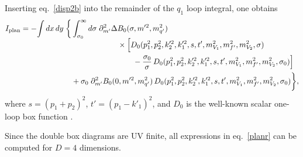 \documentclass[12pt]{article}
\begin{document}
Inserting eq.~\eqref{disp2b} into the remainder of the $q_1$ loop integral, one
obtains
\begin{align}
I_{\rm plan} = -\!\int dx \, dy \; \biggl\{ 
 &\int_{\sigma_0}^\infty d\sigma \; \partial^2_{m'}\Delta B_0(\sigma,m'^2,m_{q'}^2)
  \notag \\[-1ex]
 &\hspace{6em}\times \Bigl[ D_0(p_1^2,p_2^2,k'^2_2,k'^2_1,s,t',m_{V_1}^2,m_{f'}^2,m_{V_2}^2,\sigma)
  \notag \\
 &\hspace{8em} - \frac{\sigma_0}{\sigma}\,
  D_0(p_1^2,p_2^2,k'^2_2,k'^2_1,s,t',m_{V_1}^2,m_{f'}^2,m_{V_2}^2,\sigma_0)
  \Bigr] \notag \\
 &+\sigma_0 \; \partial^2_{m'}B_0(0,m'^2,m_{q'}^2) \,
 D_0(p_1^2,p_2^2,k'^2_2,k'^2_1,s,t',m_{V_1}^2,m_{f'}^2,m_{V_2}^2,\sigma_0)
 \biggr\}, \label{planr}
\end{align}
where $s = (p_1+p_2)^2$, $t' = (p_1-k'_1)^2$, and $D_0$ is the well-known
scalar one-loop box function \cite{hv,ff,denner}.

Since the double box diagrams are UV finite, all expressions in
eq.~\eqref{planr} can be computed for $D{=}4$ dimensions.

\medskip
\end{document}
